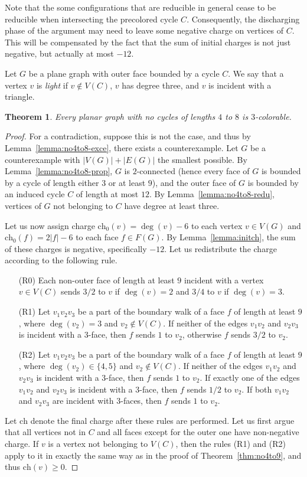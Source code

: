 \documentclass[12pt,twoside,openright,a4paper]{book}
\newtheorem{theorem}{Theorem}[chapter]
\newcommand{\initch}{\text{ch}_0}
\newcommand{\finch}{\text{ch}}
\begin{document}
Note that the some configurations that are reducible in general cease to be reducible when intersecting
the precolored cycle $C$.  Consequently, the discharging phase of the argument may need to leave some negative charge on vertices of $C$.
This will be compensated by the fact that the sum of initial charges is not just negative, but actually at most $-12$.

Let $G$ be a plane graph with outer face bounded by a cycle $C$.  We say that a vertex $v$ is \emph{light} if $v\not\in V(C)$,
$v$ has degree three, and $v$ is incident with a triangle.

\begin{theorem}\label{thm:no4to8}
Every planar graph with no cycles of lengths $4$ to $8$ is $3$-colorable.
\end{theorem}
\begin{proof}
For a contradiction, suppose this is not the case, and thus by Lemma~\ref{lemma:no4to8-exce},
there exists a counterexample.  Let $G$ be a counterexample with $|V(G)|+|E(G)|$ the smallest possible.
By Lemma~\ref{lemma:no4to8-prop}, $G$ is $2$-connected (hence every face of $G$ is bounded by a cycle of length
either $3$ or at least $9$), and the outer face of $G$ is bounded by an induced cycle
$C$ of length at most $12$.  By Lemma~\ref{lemma:no4to8-redu}, vertices of $G$ not belonging to $C$ have degree at least three.

Let us now assign charge $\initch(v)=\deg(v)-6$ to each vertex $v\in V(G)$ and $\initch(f)=2|f|-6$ to each face $f\in F(G)$.
By Lemma~\ref{lemma:initch}, the sum of these charges is negative, specifically $-12$.
Let us redistribute the charge according to the following rule.
\begin{itemize}
\item[(R0)] Each non-outer face of length at least $9$ incident with a vertex $v\in V(C)$ sends $3/2$ to $v$ if $\deg(v)=2$ and $3/4$ to $v$ if $\deg(v)=3$.
\item[(R1)] Let $v_1v_2v_3$ be a part of the boundary walk of a face $f$ of length at least $9$,
where $\deg(v_2)=3$ and $v_2\not\in V(C)$.  If neither of the edges $v_1v_2$ and $v_2v_3$ is incident with a $3$-face,
then $f$ sends $1$ to $v_2$, otherwise $f$ sends $3/2$ to $v_2$.
\item[(R2)] Let $v_1v_2v_3$ be a part of the boundary walk of a face $f$ of length at least $9$,
where $\deg(v_2)\in\{4,5\}$ and $v_2\not\in V(C)$.  If neither of the edges $v_1v_2$ and $v_2v_3$ is incident with a $3$-face,
then $f$ sends $1$ to $v_2$.  If exactly one of the edges $v_1v_2$ and $v_2v_3$ is incident with a $3$-face,
then $f$ sends $1/2$ to $v_2$.  If both $v_1v_2$ and $v_2v_3$ are incident with $3$-faces, then
$f$ sends $1$ to $v_2$.
\end{itemize}
Let $\finch$ denote the final charge after these rules are performed.
Let us first argue that all vertices not in $C$ and all faces except for the outer one have non-negative charge.
If $v$ is a vertex not belonging to $V(C)$, then the rules (R1) and (R2) apply to it in exactly the same way as in the
proof of Theorem~\ref{thm:no4to9}, and thus $\finch(v)\ge 0$.


\end{proof}
\end{document}
